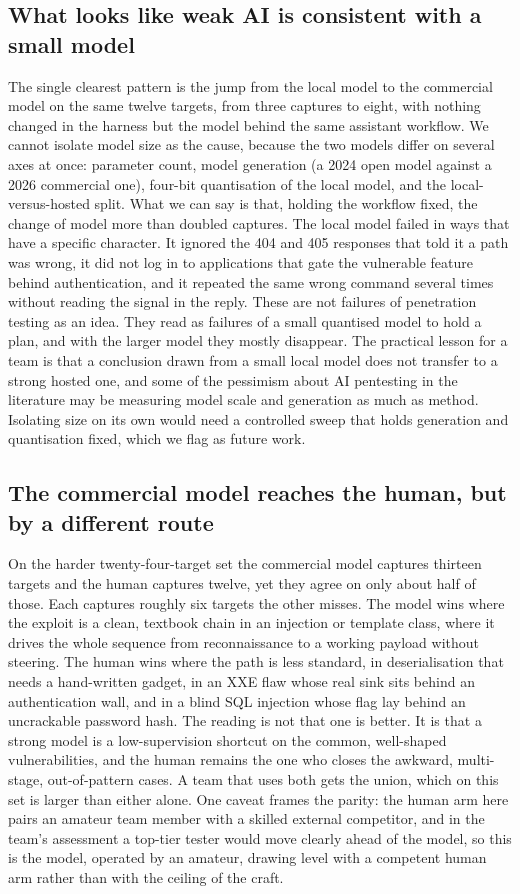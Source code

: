 \documentclass[conference]{IEEEtran}
\begin{document}
\subsection{What looks like weak AI is consistent with a small model}
The single clearest pattern is the jump from the local model to the commercial model on the same twelve targets, from three captures to eight, with nothing changed in the harness but the model behind the same assistant workflow. We cannot isolate model size as the cause, because the two models differ on several axes at once: parameter count, model generation (a 2024 open model against a 2026 commercial one), four-bit quantisation of the local model, and the local-versus-hosted split. What we can say is that, holding the workflow fixed, the change of model more than doubled captures. The local model failed in ways that have a specific character. It ignored the 404 and 405 responses that told it a path was wrong, it did not log in to applications that gate the vulnerable feature behind authentication, and it repeated the same wrong command several times without reading the signal in the reply. These are not failures of penetration testing as an idea. They read as failures of a small quantised model to hold a plan, and with the larger model they mostly disappear. The practical lesson for a team is that a conclusion drawn from a small local model does not transfer to a strong hosted one, and some of the pessimism about AI pentesting in the literature may be measuring model scale and generation as much as method. Isolating size on its own would need a controlled sweep that holds generation and quantisation fixed, which we flag as future work.

\subsection{The commercial model reaches the human, but by a different route}
On the harder twenty-four-target set the commercial model captures thirteen targets and the human captures twelve, yet they agree on only about half of those. Each captures roughly six targets the other misses. The model wins where the exploit is a clean, textbook chain in an injection or template class, where it drives the whole sequence from reconnaissance to a working payload without steering. The human wins where the path is less standard, in deserialisation that needs a hand-written gadget, in an XXE flaw whose real sink sits behind an authentication wall, and in a blind SQL injection whose flag lay behind an uncrackable password hash. The reading is not that one is better. It is that a strong model is a low-supervision shortcut on the common, well-shaped vulnerabilities, and the human remains the one who closes the awkward, multi-stage, out-of-pattern cases. A team that uses both gets the union, which on this set is larger than either alone. One caveat frames the parity: the human arm here pairs an amateur team member with a skilled external competitor, and in the team's assessment a top-tier tester would move clearly ahead of the model, so this is the model, operated by an amateur, drawing level with a competent human arm rather than with the ceiling of the craft.
\end{document}
